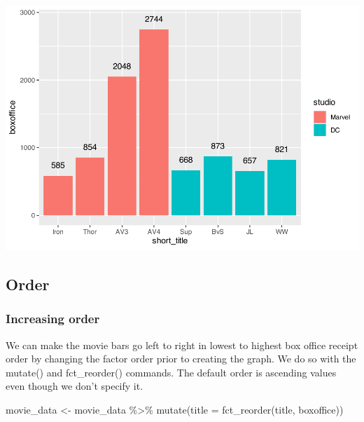 \documentclass[
]{krantz}
\makeatletter
\newenvironment{Shaded}{\begin{snugshade}}{\end{snugshade}}
\newcommand{\AttributeTok}[1]{\textcolor[rgb]{0.61,0.61,0.61}{#1}}
\newcommand{\FunctionTok}[1]{\textcolor[rgb]{0,0,0}{#1}}
\newcommand{\NormalTok}[1]{#1}
\newcommand{\OtherTok}[1]{\textcolor[rgb]{0.37,0.37,0.37}{#1}}
\newcommand{\SpecialCharTok}[1]{\textcolor[rgb]{0,0,0}{#1}}
\newenvironment{kframe}{%
\medskip{}
\setlength{\fboxsep}{.8em}
 \def\at@end@of@kframe{}%
 \ifinner\ifhmode%
  \def\at@end@of@kframe{\end{minipage}}%
  \begin{minipage}{\columnwidth}%
 \fi\fi%
 \def\FrameCommand##1{\hskip\@totalleftmargin \hskip-\fboxsep
 \colorbox{shadecolor}{##1}\hskip-\fboxsep
     \hskip-\linewidth \hskip-\@totalleftmargin \hskip\columnwidth}%
 \MakeFramed {\advance\hsize-\width
   \@totalleftmargin\z@ \linewidth\hsize
   \@setminipage}}%
 {\par\unskip\endMakeFramed%
 \at@end@of@kframe}
\renewenvironment{Shaded}{\begin{kframe}}{\end{kframe}}
\makeatother
\begin{document}
\includegraphics[width=0.65\linewidth]{bookdown_files/figure-latex/unnamed-chunk-118-1}

\hypertarget{order}{%
\subsection{Order}\label{order}}

\hypertarget{increasing-order}{%
\subsubsection{Increasing order}\label{increasing-order}}

We can make the movie bars go left to right in lowest to highest box office receipt order by changing the factor order prior to creating the graph. We do so with the mutate() and fct\_reorder() commands. The default order is ascending values even though we don't specify it.

\begin{Shaded}
\begin{Highlighting}[]
\NormalTok{movie\_data }\OtherTok{\textless{}{-}}\NormalTok{ movie\_data }\SpecialCharTok{\%\textgreater{}\%} 
  \FunctionTok{mutate}\NormalTok{(}\AttributeTok{title =} \FunctionTok{fct\_reorder}\NormalTok{(title,}
\NormalTok{                             boxoffice))}
\end{Highlighting}
\end{Shaded}
\end{document}
